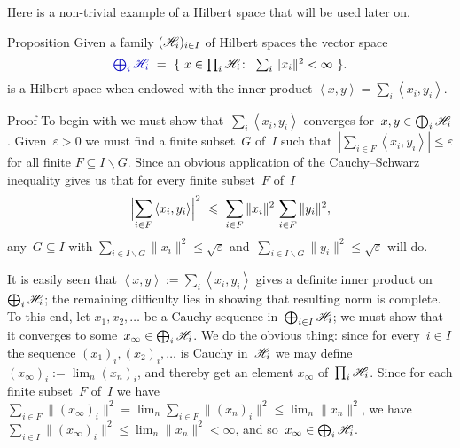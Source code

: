 \documentclass[a]{subfiles}
\begin{document}
\begin{parsec}%
\begin{point}%
Here is a non-trivial
example of a Hilbert space
that will be used later on.
\end{point}
\begin{point}{Proposition}%
Given a family  $(\mathscr{H}_i)_{i\in I}$ 
of Hilbert spaces
the vector space
\begin{equation*}
	\textstyle
	\Define{\bigoplus_i \scrH_i} \ =\ \{\ 
		x\in \prod_i \scrH_i\colon\ 
	\sum_i \|x_i\|^2 <\infty \ \}.
\end{equation*}%
%
is a Hilbert space
when endowed with the inner product
$\left<x,y\right>=\sum_i \left<x_i,y_i\right>$.
\begin{point}{Proof}%
To begin with
we must show that~$\sum_i \left<x_i,y_i\right>$
converges for~$x,y\in\bigoplus_i \mathscr{H}_i$.
Given~$\varepsilon>0$
we must
find a finite subset~$G$ of~$I$
such that~$ \left|\sum_{i \in F} \left<x_i,y_i\right>\right|
\leq \varepsilon$ for all finite $F\subseteq I\backslash G$.
Since an obvious application
of the Cauchy--Schwarz inequality
gives
us that for every finite subset~$F$ of~$I$
\begin{equation*}
	\Bigl|\sum_{i\in F}
	\left<x_i,y_i\right>\Bigr|^2
	\ \leq\ 
	\sum_{i\in F}\|x_i\|^2
	\, \sum_{i\in F}\|y_i\|^2,
\end{equation*}
any~$G\subseteq I$
with $\sum_{i\in I\backslash G} \|x_i\|^2 \leq \sqrt{\varepsilon}$
	and~$\sum_{i\in I\backslash G} \|y_i\|^2 \leq \sqrt{\varepsilon}$
will do.

It is easily seen that
$\left<x,y\right>:=\sum_i \left<x_i,y_i\right>$
gives a definite inner product on~$\bigoplus_i \mathscr{H}_i$; the
remaining difficulty
lies in showing that resulting norm is complete.
To this end, let $x_1,x_2,\dotsc$ be a Cauchy sequence 
in~$\bigoplus_{i\in I}\mathscr{H}_i$;
we must show that it converges to some~$x_\infty\in \bigoplus_i \mathscr{H}_i$.
We do the obvious thing:
since for every~$i\in I$
the sequence $(x_1)_i, (x_2)_i,\dotsc$
is Cauchy in~$\mathscr{H}_i$
we may define $(x_\infty)_i:=\lim_n (x_n)_i$,
and thereby get an element $x_\infty$ of~$\prod_i \mathscr{H}_i$.
Since for each finite subset~$F$ of~$I$
we have $\sum_{i\in F} \|(x_\infty)_i\|^2
=\lim_n \sum_{i\in F} \|(x_n)_i\|^2
\leq \lim_n \|x_n\|^2$,
we have $\sum_{i\in I} \|(x_\infty)_i\|^2 
\leq \lim_n \|x_n\|^2 <\infty$,
and so~$x_\infty\in\bigoplus_i \mathscr{H}_i$.


\end{point}
\end{point}
\end{parsec}
\end{document}

